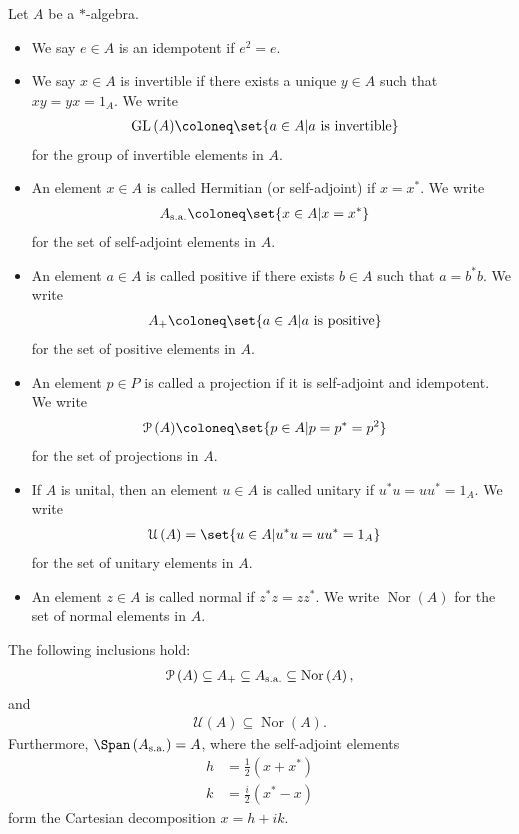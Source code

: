 \begin{definition}
  Let $A$ be a $\ast$-algebra.
  \begin{itemize}
    \item We say $e\in A$ is an idempotent if $e^2 = e$.
    \item We say $x\in A$ is invertible if there exists a unique $y\in A$ such that $xy = yx = 1_A$. We write
      \begin{align*}
        \text{GL}\left(A\right) &\coloneq \set{a\in A | a\text{ is invertible}}
      \end{align*}
      for the group of invertible elements in $A$.
    \item An element $x\in A$ is called Hermitian (or self-adjoint) if $x = x^{\ast}$. We write
      \begin{align*}
        A_{\sa} &\coloneq \set{x\in A | x = x^{\ast}}
      \end{align*}
      for the set of self-adjoint elements in $A$.
    \item An element $a\in A$ is called positive if there exists $b\in A$ such that $a = b^{\ast}b$. We write
      \begin{align*}
        A_{+} &\coloneq \set{a\in A | a\text{ is positive}}
      \end{align*}
      for the set of positive elements in $A$.
    \item An element $p\in P$ is called a projection if it is self-adjoint and idempotent. We write
      \begin{align*}
        \mathcal{P}\left(A\right) &\coloneq \set{p\in A | p = p^{\ast} = p^2}
      \end{align*}
      for the set of projections in $A$.
    \item If $A$ is unital, then an element $u\in A$ is called unitary if $u^{\ast}u = uu^{\ast} = 1_A$. We write
      \begin{align*}
        \mathcal{U}\left(A\right) &= \set{u\in A | u^{\ast}u = uu^{\ast} = 1_A}
      \end{align*}
      for the set of unitary elements in $A$.
    \item An element $z\in A$ is called normal if $z^{\ast}z = zz^{\ast}$. We write $\operatorname{Nor}\left(A\right)$ for the set of normal elements in $A$.
  \end{itemize}
\end{definition}
\begin{fact}
  The following inclusions hold:
  \begin{align*}
    \mathcal{P}\left(A\right) \subseteq A_{+} \subseteq A_{\operatorname{s.a.}}\subseteq \operatorname{Nor}\left(A\right),
  \end{align*}
  and
  \begin{align*}
    \mathcal{U}\left(A\right)\subseteq \operatorname{Nor}\left(A\right).
  \end{align*}
  Furthermore, $\Span\left(A_{\sa}\right) = A$, where the self-adjoint elements
  \begin{align*}
    h &= \frac{1}{2}\left(x + x^{\ast}\right)\\
    k &= \frac{i}{2}\left(x^{\ast}-x\right)
  \end{align*}
  form the Cartesian decomposition $x = h + ik$.
\end{fact}
